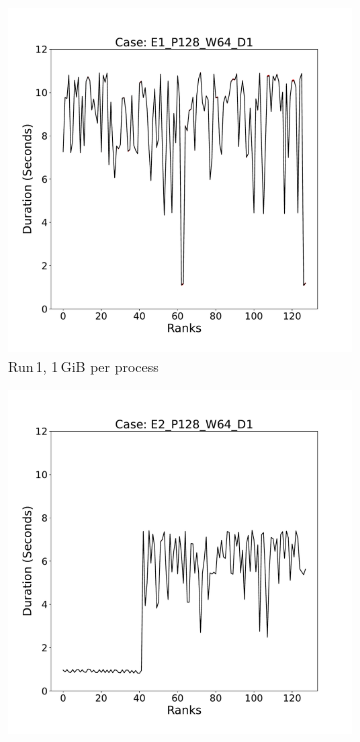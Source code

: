 \begin{figure}
     \centering
    \begin{subfigure}[b]{0.3\textwidth}
         \centering
         \includegraphics[width=\textwidth, height=\textwidth]{figures/E1_P128_W64_D1.pdf}
         \caption{Run\,1, 1\,GiB per process}
         \label{fig:E1_1_d3}
     \end{subfigure}
     \hfill
     \begin{subfigure}[b]{0.3\textwidth}
         \centering
         \includegraphics[width=\textwidth, height=\textwidth]{figures/E2_P128_W64_D1.pdf}

\end{subfigure}
\end{figure}
